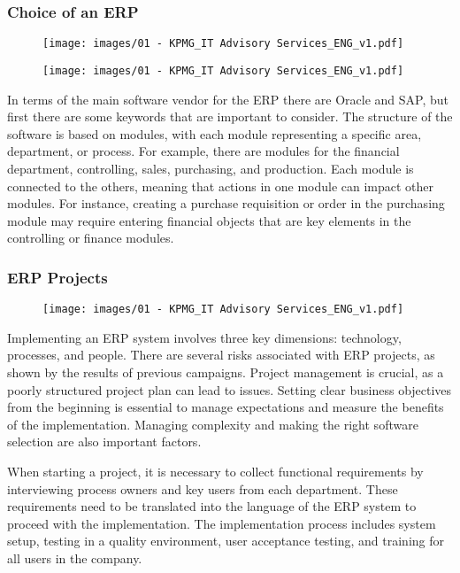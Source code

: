 \subsubsection{Choice of an ERP}
\begin{figure}[!h]
    \centering
    \texttt{[image: images/01 - KPMG\_IT Advisory Services\_ENG\_v1.pdf]}
\end{figure}

\begin{figure}[!h]
    \centering
    \texttt{[image: images/01 - KPMG\_IT Advisory Services\_ENG\_v1.pdf]}
\end{figure}

In terms of the main software vendor for the ERP there are Oracle and SAP, but first there are some keywords that are important to consider. The structure of the
software is based on modules, with each module representing a specific
area, department, or process. For example, there are modules for the
financial department, controlling, sales, purchasing, and production.
Each module is connected to the others, meaning that actions in one module
can impact other modules. For instance, creating a purchase requisition
or order in the purchasing module may require entering financial objects
that are key elements in the controlling or finance modules.

\subsubsection{ERP Projects}

\begin{figure}[!h]
    \centering
    \texttt{[image: images/01 - KPMG\_IT Advisory Services\_ENG\_v1.pdf]}
\end{figure}

Implementing an ERP system involves three key dimensions: technology,
processes, and people. There are several risks associated with ERP
projects, as shown by the results of previous campaigns. Project
management is crucial, as a poorly structured project plan can lead to
issues. Setting clear business objectives from the beginning is
essential to manage expectations and measure the benefits of the
implementation. Managing complexity and making the right software
selection are also important factors.

When starting a project, it is necessary to collect functional
requirements by interviewing process owners and key users from each
department. These requirements need to be translated into the language
of the ERP system to proceed with the implementation. The implementation
process includes system setup, testing in a quality environment, user
acceptance testing, and training for all users in the company.

